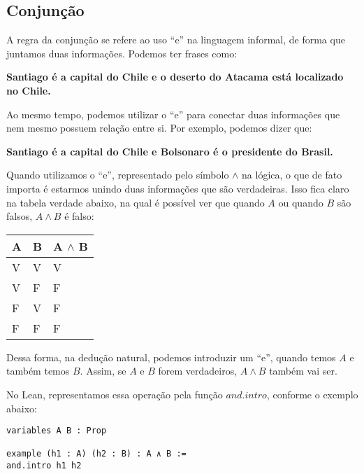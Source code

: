 \subsection{Conjunção}
A regra da conjunção se refere ao uso ``e'' na linguagem informal, de forma que juntamos duas informações. Podemos ter frases como:
\begin{center}
\textbf{Santiago é a capital do Chile e o deserto do Atacama está localizado no Chile.}\\
\end{center}

Ao mesmo tempo, podemos utilizar o ``e'' para conectar duas informações que nem mesmo possuem relação entre si. Por exemplo, podemos dizer que:
\begin{center}
\textbf{Santiago é a capital do Chile e Bolsonaro é o presidente do Brasil.}\\
\end{center}
Quando utilizamos o ``e'', representado pelo símbolo $\land$ na lógica, o que de fato importa é estarmos unindo duas informações que são verdadeiras. Isso fica claro na tabela verdade abaixo, na qual é possível ver que quando $A$ ou quando $B$ são falsos, $A\land B$ é falso:

\begin{table}[htb]
\centering
\begin{tabular}{|l|l|l|}
\hline
\textbf{A} & \textbf{B} & \textbf{A $\land$ B} \\ \hline
V          & V          & V                  \\ \hline
V          & F          & F                  \\ \hline
F          & V          & F                  \\ \hline
F          & F          & F                  \\ \hline
\end{tabular}
\end{table}

Dessa forma, na dedução natural, podemos introduzir um ``e'', quando temos $A$ e também temos $B$. Assim, se $A$ e $B$ forem verdadeiros, $A \land B$ também vai ser. 

 \begin{prooftree}
\end{prooftree}

No Lean, representamos essa operação pela função $and.intro$, conforme o exemplo abaixo:
\vspace{5mm}
\begin{lstlisting} 
variables A B : Prop

example (h1 : A) (h2 : B) : A ∧ B :=
and.intro h1 h2
\end{lstlisting}
\vspace{5mm}

